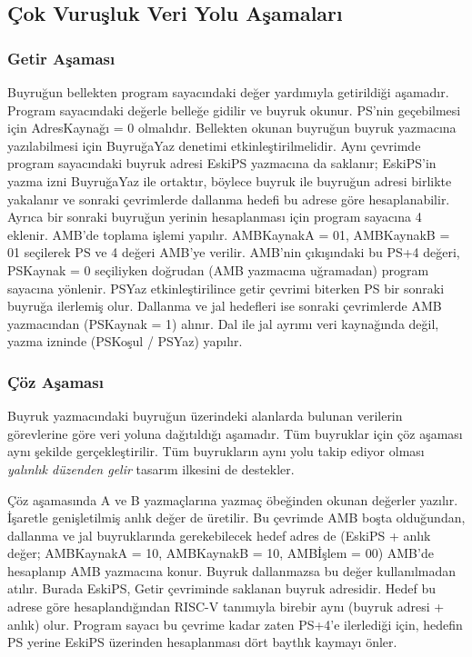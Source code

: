 \subsection{Çok Vuruşluk Veri Yolu Aşamaları}
\label{subsec:cok-vurusluk-asamalar}

\subsubsection{Getir Aşaması}

Buyruğun bellekten program sayacındaki değer yardımıyla getirildiği aşamadır. Program sayacındaki değerle belleğe gidilir ve buyruk okunur. PS'nin geçebilmesi için AdresKaynağı = 0 olmalıdır. Bellekten okunan buyruğun buyruk yazmacına yazılabilmesi için BuyruğaYaz denetimi etkinleştirilmelidir. Aynı çevrimde program sayacındaki buyruk adresi EskiPS yazmacına da saklanır; EskiPS'in yazma izni BuyruğaYaz ile ortaktır, böylece buyruk ile buyruğun adresi birlikte yakalanır ve sonraki çevrimlerde dallanma hedefi bu adrese göre hesaplanabilir. Ayrıca bir sonraki buyruğun yerinin hesaplanması için program sayacına 4 eklenir. AMB'de toplama işlemi yapılır. AMBKaynakA = 01, AMBKaynakB = 01 seçilerek PS ve 4 değeri AMB'ye verilir. AMB'nin çıkışındaki bu PS+4 değeri, PSKaynak = 0 seçiliyken doğrudan (AMB yazmacına uğramadan) program sayacına yönlenir. PSYaz etkinleştirilince getir çevrimi biterken PS bir sonraki buyruğa ilerlemiş olur. Dallanma ve jal hedefleri ise sonraki çevrimlerde AMB yazmacından (PSKaynak = 1) alınır. Dal ile jal ayrımı veri kaynağında değil, yazma izninde (PSKoşul / PSYaz) yapılır.

\subsubsection{Çöz Aşaması}

Buyruk yazmacındaki buyruğun üzerindeki alanlarda bulunan verilerin görevlerine göre veri yoluna dağıtıldığı aşamadır. Tüm buyruklar için çöz aşaması aynı şekilde gerçekleştirilir. Tüm buyrukların aynı yolu takip ediyor olması \emph{yalınlık düzenden gelir} tasarım ilkesini de destekler.

Çöz aşamasında A ve B yazmaçlarına yazmaç öbeğinden okunan değerler yazılır. İşaretle genişletilmiş anlık değer de üretilir. Bu çevrimde AMB boşta olduğundan, dallanma ve jal buyruklarında gerekebilecek hedef adres de (EskiPS + anlık değer; AMBKaynakA = 10, AMBKaynakB = 10, AMBİşlem = 00) AMB'de hesaplanıp AMB yazmacına konur. Buyruk dallanmazsa bu değer kullanılmadan atılır. Burada EskiPS, Getir çevriminde saklanan buyruk adresidir. Hedef bu adrese göre hesaplandığından RISC-V tanımıyla birebir aynı (buyruk adresi + anlık) olur. Program sayacı bu çevrime kadar zaten PS+4'e ilerlediği için, hedefin PS yerine EskiPS üzerinden hesaplanması dört baytlık kaymayı önler.

